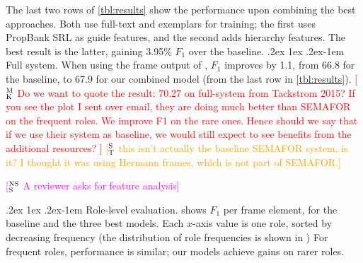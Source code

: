 \documentclass[11pt,a4paper]{article}
\makeatletter
\newcommand{\ensuretext}[1]{#1}
\newcommand{\nssmarker}{\ensuretext{\textcolor{magenta}{\ensuremath{^{\textsc{NS}}_{\textsc{S}}}}}}
\newcommand{\mkmarker}{\ensuretext{\textcolor{red}{\ensuremath{^{\textsc{M}}_{\textsc{K}}}}}}
\newcommand{\stmarker}{\ensuretext{\textcolor{orange}{\ensuremath{^{\textsc{S}}_{\textsc{T}}}}}}
\newcommand{\arkcomment}[3]{\ensuretext{\textcolor{#3}{[#1 #2]}}}
\newcommand{\nss}[1]{\arkcomment{\nssmarker}{#1}{magenta}}
\newcommand{\mk}[1]{\arkcomment{\mkmarker}{#1}{red}}
\newcommand{\st}[1]{\arkcomment{\stmarker}{#1}{orange}}
\renewcommand{\paragraph}{%
  \@startsection{paragraph}{4}%
  {\z@}{.2ex \@plus 1ex \@minus .2ex}{-1em}%
  {\normalfont\normalsize\bfseries}%
}
\newcommand{\finalversion}[1]{#1}
\makeatother
\begin{document}
The last two rows of 
\cref{tbl:results} show the performance upon combining the best
approaches.  Both use full-text and exemplars for training; the
first uses PropBank SRL as guide features, and the second adds hierarchy %
features.  
The best result is the latter, gaining 3.95\% $F_1$ over the baseline.
\paragraph{Full system.} When using the frame output of \cite{hermann-14}, $F_1$
improves by 1.1, from 66.8 for the baseline, to 67.9 for our combined
model (from the last row in \cref{tbl:results}).
\mk{Do we want to quote the result: 70.27 on full-system 
from Tackstrom 2015? If you see the plot I sent over email, they
are doing much better than SEMAFOR on the frequent roles. We improve F1 on the rare ones.
Hence should we say that if we use their system as baseline, we would still
expect to see benefits from the additional resources? }
\st{this isn't actually the baseline SEMAFOR system, is it? I thought it was
using Hermann frames, which is not part of SEMAFOR.}

\nss{A reviewer asks for feature analysis}

\paragraph{Role-level evaluation.}
 shows $F_1$ per frame element, for the
baseline and the three best models. %
Each $x$-axis value is one role, sorted by decreasing frequency 
(the distribution of role frequencies is shown in )
For frequent roles,
performance is similar; our models achieve gains on rarer roles.

%
\end{document}
